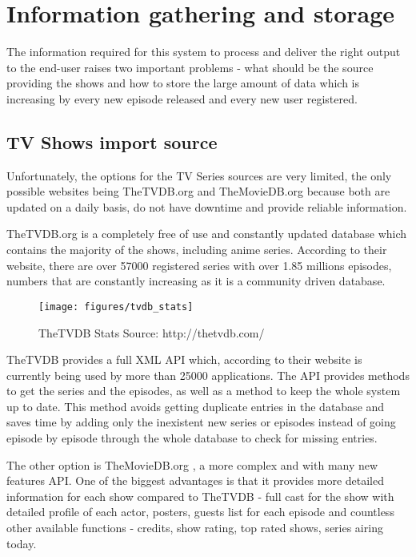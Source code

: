 \section{Information gathering and storage}

The information required for this system to process and deliver the right output to the end-user raises two important problems - what should be the source providing the shows and how to store the large amount of data which is increasing by every new episode released and every new user registered.

\subsection{TV Shows import source}

Unfortunately, the options for the TV Series sources are very limited, the only possible websites being TheTVDB.org and TheMovieDB.org because both are updated on a daily basis, do not have downtime and provide reliable information.

TheTVDB.org \cite{4} is a completely free of use and constantly updated database which contains the majority of the shows, including anime series. According to their website, there are over 57000 registered series with over 1.85 millions episodes, numbers that are constantly increasing as it is a community driven database.

\begin{wrapfigure}{r}{0.45\textwidth}
\centering
\texttt{[image: figures/tvdb\_stats]}
\caption{TheTVDB Stats \newline Source: http://thetvdb.com/}
\vspace{-1em}
\label{fig:tvdbstats}
\end{wrapfigure}

TheTVDB provides a full XML API which, according to their website is currently being used by more than 25000 applications. The API provides methods to get the series and the episodes, as well as a method to keep the whole system up to date. This method avoids getting duplicate entries in the database and saves time by adding only the inexistent new series or episodes instead of going episode by episode through the whole database to check for missing entries.

The other option is TheMovieDB.org \cite{3}, a more complex and with many new features API. One of the biggest advantages is that it provides more detailed information for each show compared to TheTVDB - full cast for the show with detailed profile of each actor, posters, guests list for each episode and countless other available functions - credits, show rating, top rated shows, series airing today.

